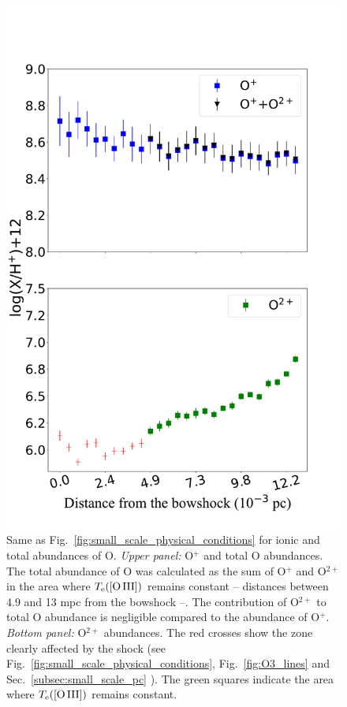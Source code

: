 \documentclass[twocolumn,linenumbers]{aastex63}
\newcommand{\jorge}[1]{{\color{magenta}J: #1}}
\newcommand{\cesar}[1]{{\color{red}C: #1}}
\begin{document}
\begin{figure}
\centering
\includegraphics[width=\columnwidth]{O_abundances.pdf}
\caption{Same as Fig.~\ref{fig:small_scale_physical_conditions} for ionic and total abundances of O. \textit{Upper panel:} O$^{+}$ and total O abundances. The total abundance of O was calculated as the sum of O$^{+}$ and O$^{2+}$ in the area where $T_{\rm e}(\text{[O\thinspace III]})$ remains constant -- distances between 4.9 and 13 mpc from the bowshock --. The contribution of O$^{2+}$ to total O abundance is negligible compared to the abundance of O$^{+}$. \textit{Bottom panel:} O$^{2+}$ abundances. The red crosses  show the zone clearly affected by the shock (see Fig.~\ref{fig:small_scale_physical_conditions}, Fig.~\ref{fig:O3_lines} and Sec.~\ref{subsec:small_scale_pc} ). The green squares indicate the area where $T_{\rm e}(\text{[O\thinspace III]})$ remains constant.} %
\label{fig:O_abundances}
\end{figure}
\end{document}
